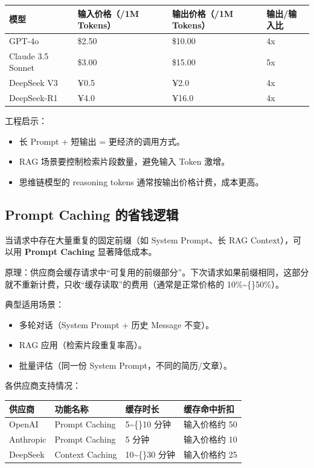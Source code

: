 \documentclass[10pt,a4paper]{ctexart}
\begin{document}
{\footnotesize
\begin{tabularx}{\textwidth}{|X|X|X|X|}
\hline
\textbf{模型} & \textbf{输入价格（/1M Tokens）} & \textbf{输出价格（/1M Tokens）} & \textbf{输出/输入比} \\
\hline
GPT-4o & \$2.50 & \$10.00 & 4x \\
\hline
Claude 3.5 Sonnet & \$3.00 & \$15.00 & 5x \\
\hline
DeepSeek V3 & ¥0.5 & ¥2.0 & 4x \\
\hline
DeepSeek-R1 & ¥4.0 & ¥16.0 & 4x \\
\hline
\end{tabularx}
}



工程启示：


\begin{itemize}[itemsep=2pt, topsep=4pt]
  \item 长 Prompt + 短输出 = 更经济的调用方式。
  \item RAG 场景要控制检索片段数量，避免输入 Token 激增。
  \item 思维链模型的 reasoning tokens 通常按输出价格计费，成本更高。
\end{itemize}


\subsection{Prompt Caching 的省钱逻辑}


当请求中存在大量重复的固定前缀（如 System Prompt、长 RAG Context），可以用 \textbf{Prompt Caching} 显著降低成本。



原理：供应商会缓存请求中“可复用的前缀部分”。下次请求如果前缀相同，这部分就不重新计费，只收“缓存读取”的费用（通常是正常价格的 10\%\textasciitilde\{\}50\%）。



典型适用场景：


\begin{itemize}[itemsep=2pt, topsep=4pt]
  \item 多轮对话（System Prompt + 历史 Message 不变）。
  \item RAG 应用（检索片段重复率高）。
  \item 批量评估（同一份 System Prompt，不同的简历/文章）。
\end{itemize}


各供应商支持情况：


{\footnotesize
\begin{tabularx}{\textwidth}{|X|X|X|X|}
\hline
\textbf{供应商} & \textbf{功能名称} & \textbf{缓存时长} & \textbf{缓存命中折扣} \\
\hline
OpenAI & Prompt Caching & 5\textasciitilde\{\}10 分钟 & 输入价格约 50\\%
\hline
Anthropic & Prompt Caching & 5 分钟 & 输入价格约 10\\%
\hline
DeepSeek & Context Caching & 10\textasciitilde\{\}30 分钟 & 输入价格约 25\\%
\hline
\end{tabularx}
}
\end{document}
